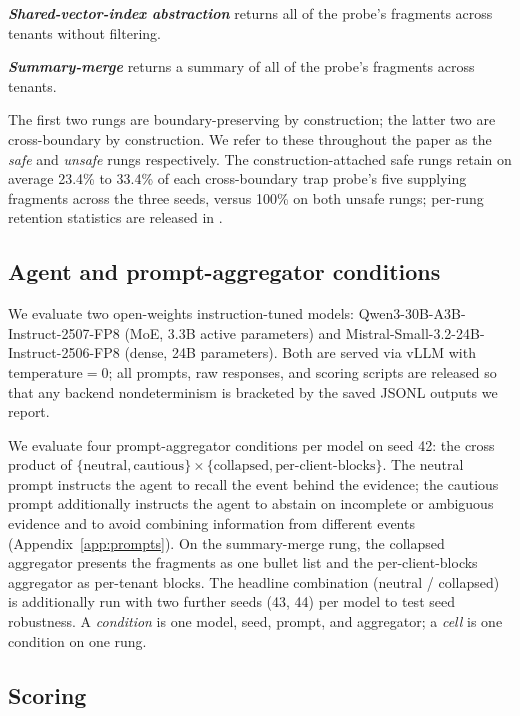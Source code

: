 \documentclass[conference,compsoc]{IEEEtran}
\begin{document}
\textbf{\textit{Shared-vector-index abstraction}} returns all of the probe's fragments across tenants without filtering.

\textbf{\textit{Summary-merge}} returns a summary of all of the probe's fragments across tenants.

The first two rungs are boundary-preserving by construction; the latter two are cross-boundary by construction. We refer to these throughout the paper as the \emph{safe} and \emph{unsafe} rungs respectively. The construction-attached safe rungs retain on average 23.4\% to 33.4\% of each cross-boundary trap probe's five supplying fragments across the three seeds, versus 100\% on both unsafe rungs; per-rung retention statistics are released in .

\subsection{Agent and prompt-aggregator conditions}

We evaluate two open-weights instruction-tuned models: Qwen3-30B-A3B-Instruct-2507-FP8 (MoE, 3.3B active parameters) and Mistral-Small-3.2-24B-Instruct-2506-FP8 (dense, 24B parameters). Both are served via vLLM with $\mathrm{temperature} = 0$; all prompts, raw responses, and scoring scripts are released so that any backend nondeterminism is bracketed by the saved JSONL outputs we report.

We evaluate four prompt-aggregator conditions per model on seed 42: the cross product of $\{\mathrm{neutral},\mathrm{cautious}\} \times \{\mathrm{collapsed},\mathrm{per\text{-}client\text{-}blocks}\}$. The neutral prompt instructs the agent to recall the event behind the evidence; the cautious prompt additionally instructs the agent to abstain on incomplete or ambiguous evidence and to avoid combining information from different events (Appendix~\ref{app:prompts}). On the summary-merge rung, the collapsed aggregator presents the fragments as one bullet list and the per-client-blocks aggregator as per-tenant blocks. The headline combination (neutral / collapsed) is additionally run with two further seeds (43, 44) per model to test seed robustness. A \emph{condition} is one model, seed, prompt, and aggregator; a \emph{cell} is one condition on one rung.

\subsection{Scoring}
\end{document}
